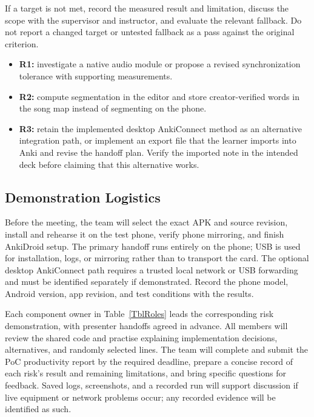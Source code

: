 \documentclass{article}
\begin{document}
If a target is not met, record the measured result and limitation, discuss the
scope with the supervisor and instructor, and evaluate the relevant fallback.
Do not report a changed target or untested fallback as a pass against the
original criterion.
\begin{itemize}
    \item \textbf{R1:} investigate a native audio module or propose a revised
    synchronization tolerance with supporting measurements.
    \item \textbf{R2:} compute segmentation in the editor and store
    creator-verified words in the song map instead of segmenting on the phone.
    \item \textbf{R3:} retain the implemented desktop AnkiConnect method
    as an alternative integration path, or implement an export file that the
    learner imports
    into Anki and revise the handoff plan. Verify the imported note in the
    intended deck before claiming that this alternative works.
\end{itemize}

\subsection{Demonstration Logistics}

Before the meeting, the team will select the exact APK and source revision,
install and rehearse it on the test phone, verify phone mirroring, and finish
AnkiDroid setup. The primary handoff runs entirely on the phone; USB is used
for installation, logs, or mirroring rather than to transport the card. The
optional desktop AnkiConnect path requires a trusted local network or USB
forwarding and must be identified separately if demonstrated.
Record the phone model, Android version, app revision, and test conditions with
the results.

Each component owner in Table~\ref{TblRoles} leads the corresponding risk
demonstration, with presenter handoffs agreed in advance. All members will
review the shared code and practise explaining implementation decisions,
alternatives, and randomly selected lines. The team will complete and submit
the PoC productivity report by the required deadline, prepare a concise record
of each risk's result and remaining limitations, and bring specific questions
for feedback. Saved logs, screenshots, and a recorded run will support discussion
if live equipment or network problems occur; any recorded evidence will be
identified as such.
\end{document}
